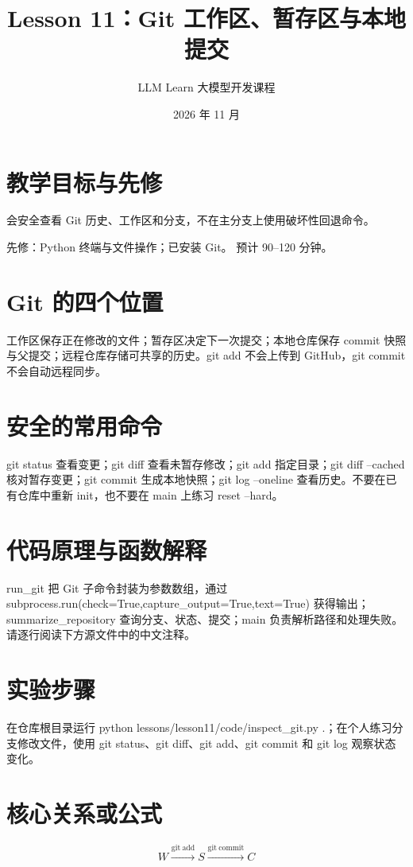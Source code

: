 \documentclass[UTF8,11pt,a4paper]{ctexart}
\begin{document}
\title{Lesson 11：Git 工作区、暂存区与本地提交}
\author{LLM Learn 大模型开发课程}
\date{2026 年 11 月}
\maketitle
\tableofcontents
\newpage
\section{教学目标与先修}
会安全查看 Git 历史、工作区和分支，不在主分支上使用破坏性回退命令。\par
先修：Python 终端与文件操作；已安装 Git。 预计 90–120 分钟。\par
\section{Git 的四个位置}
工作区保存正在修改的文件；暂存区决定下一次提交；本地仓库保存 commit 快照与父提交；远程仓库存储可共享的历史。git add 不会上传到 GitHub，git commit 不会自动远程同步。

\section{安全的常用命令}
git status 查看变更；git diff 查看未暂存修改；git add 指定目录；git diff --cached 核对暂存变更；git commit 生成本地快照；git log --oneline 查看历史。不要在已有仓库中重新 init，也不要在 main 上练习 reset --hard。

\section{代码原理与函数解释}
run\_git 把 Git 子命令封装为参数数组，通过 subprocess.run(check=True,capture\_output=True,text=True) 获得输出；summarize\_repository 查询分支、状态、提交；main 负责解析路径和处理失败。请逐行阅读下方源文件中的中文注释。

\section{实验步骤}
在仓库根目录运行 python lessons/lesson11/code/inspect\_git.py .；在个人练习分支修改文件，使用 git status、git diff、git add、git commit 和 git log 观察状态变化。

\section{核心关系或公式}
\[
W\xrightarrow{\mathrm{git\ add}}S\xrightarrow{\mathrm{git\ commit}}C
\]
\end{document}
